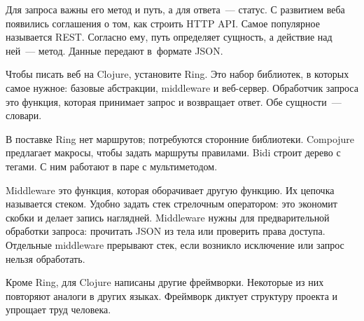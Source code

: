 Для запроса важны его метод и путь, а для ответа~--- статус. С развитием веба
появились соглашения о том, как строить HTTP API. Самое популярное называется
REST. Согласно ему, путь определяет сущность, а действие над ней~---
метод. Данные передают в~формате JSON.

Чтобы писать веб на Clojure, установите Ring. Это набор библиотек, в которых
самое нужное: базовые абстракции, middleware и веб-сервер. Обработчик запроса
это функция, которая принимает запрос и возвращает ответ. Обе сущности~---
словари.

В поставке Ring нет маршрутов; потребуются сторонние библиотеки. Compojure
предлагает макросы, чтобы задать маршруты правилами. Bidi строит дерево с
тегами. С ним работают в паре с мультиметодом.

Middleware это функция, которая оборачивает другую функцию. Их цепочка
называется стеком. Удобно задать стек стрелочным оператором: это экономит скобки
и делает запись наглядней. Middleware нужны для предварительной обработки
запроса: прочитать JSON из тела или проверить права доступа. Отдельные middleware
прерывают стек, если возникло исключение или запрос нельзя обработать.

Кроме Ring, для Clojure написаны другие фреймворки. Некоторые из них повторяют
аналоги в других языках. Фреймворк диктует структуру проекта и упрощает труд
человека.
